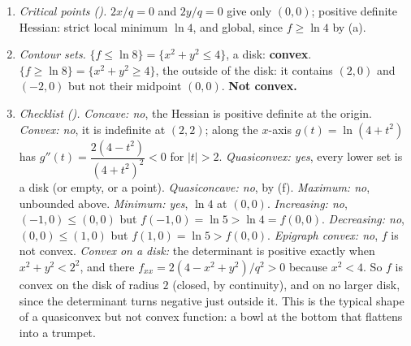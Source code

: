 \begin{solutions}
\begin{enumerate}[label=(\alph*),leftmargin=1.8em,itemsep=0.4ex]
          \item \emph{Critical points ().} $2x/q=0$ and
                $2y/q=0$ give only $(0,0)$; positive definite Hessian: strict
                local minimum $\ln4$, and global, since $f\ge\ln4$ by (a).
          \item \emph{Contour sets.} $\{f\le\ln8\}=\{x^{2}+y^{2}\le4\}$, a
                disk: \textbf{convex}. $\{f\ge\ln8\}=\{x^{2}+y^{2}\ge4\}$,
                the outside of the disk: it contains $(2,0)$ and $(-2,0)$
                but not their midpoint $(0,0)$. \textbf{Not convex.}
          \item \emph{Checklist ().}
                \emph{Concave: no}, the Hessian is positive definite at the
                origin.
                \emph{Convex: no}, it is indefinite at $(2,2)$; along the
                $x$-axis $g(t)=\ln(4+t^{2})$ has
                $g''(t)=\dfrac{2(4-t^{2})}{(4+t^{2})^{2}}<0$ for $|t|>2$.
                \emph{Quasiconvex: yes}, every lower set is a disk (or
                empty, or a point).
                \emph{Quasiconcave: no}, by (f).
                \emph{Maximum: no}, unbounded above.
                \emph{Minimum: yes}, $\ln4$ at $(0,0)$.
                \emph{Increasing: no}, $(-1,0)\le(0,0)$ but
                $f(-1,0)=\ln5>\ln4=f(0,0)$.
                \emph{Decreasing: no}, $(0,0)\le(1,0)$ but
                $f(1,0)=\ln5>f(0,0)$.
                \emph{Epigraph convex: no}, $f$ is not convex.
                \emph{Convex on a disk:} the determinant is positive
                exactly when $x^{2}+y^{2}<2^{2}$, and there
                $f_{xx}=2(4-x^{2}+y^{2})/q^{2}>0$ because $x^{2}<4$. So $f$
                is convex on the disk of radius $2$ (closed, by continuity),
                and on no larger disk, since the determinant turns negative
                just outside it. This is the typical shape of a
                quasiconvex but not convex function: a bowl at the bottom
                that flattens into a trumpet.
        \end{enumerate}
\end{solutions}
